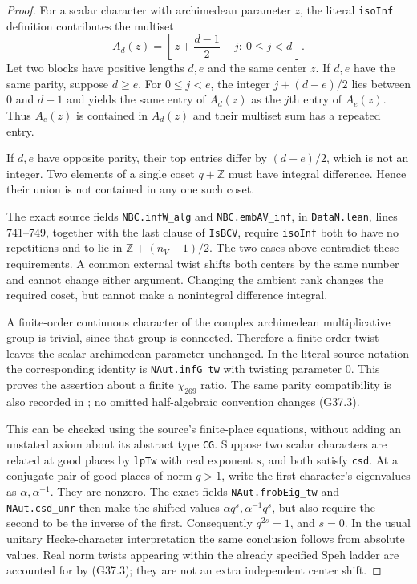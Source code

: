 \begin{proof}
For a scalar character with archimedean parameter $z$, the
literal \texttt{isoInf} definition contributes the multiset
\[
 A_d(z)=\left[\,z+\frac{d-1}{2}-j:\ 0\le j<d\,\right].
                                                               \tag{G37.3}
\]
Let two blocks have positive lengths $d,e$ and the same center
$z$.  If $d,e$ have the same parity, suppose $d\ge e$.
For $0\le j<e$, the integer $j+(d-e)/2$ lies between $0$
and $d-1$ and yields the same entry of $A_d(z)$ as the
$j$th entry of $A_e(z)$.  Thus $A_e(z)$ is contained in
$A_d(z)$ and their multiset sum has a repeated entry.

If $d,e$ have opposite parity, their top entries differ by
$(d-e)/2$, which is not an integer.  Two elements of a single
coset $q+\mathbb Z$ must have integral difference.  Hence
their union is not contained in any one such coset.

The exact source fields \texttt{NBC.infW\_alg} and
\texttt{NBC.embAV\_inf}, in \texttt{DataN.lean}, lines
741--749, together with the last clause of \texttt{IsBCV},
require \texttt{isoInf} both to have no repetitions and
to lie in
$\mathbb Z+(n_V-1)/2$.  The two cases above contradict
these requirements.  A common external twist shifts both
centers by the same number and cannot change either argument.
Changing the ambient rank changes the required coset, but
cannot make a nonintegral difference integral.

A finite-order continuous character of the complex
archimedean multiplicative group is trivial, since that
group is connected.  Therefore a finite-order twist leaves
the scalar archimedean parameter unchanged.  In the literal
source notation the corresponding identity is
\texttt{NAut.infG\_tw} with twisting parameter $0$.
This proves the assertion about a finite $\chi_{269}$ ratio.
The same parity compatibility is also recorded in
; no omitted
half-algebraic convention changes (G37.3).

This can be checked using the source's finite-place equations,
without adding an unstated axiom about its abstract type
\texttt{CG}.  Suppose two scalar characters are related at
good places by \texttt{lpTw} with real exponent $s$, and
both satisfy \texttt{csd}.  At a conjugate pair of good places
of norm $q>1$, write the first character's eigenvalues as
$\alpha,\alpha^{-1}$.  They are nonzero.  The exact fields
\texttt{NAut.frobEig\_tw} and \texttt{NAut.csd\_unr}
then make the shifted values
$\alpha q^s,\alpha^{-1}q^s$, but also require the second
to be the inverse of the first.  Consequently $q^{2s}=1$,
and $s=0$.  In the usual unitary Hecke-character
interpretation the same conclusion follows from absolute
values.  Real norm twists appearing within the already
specified Speh ladder are accounted for by (G37.3); they
are not an extra independent center shift.


\end{proof}
